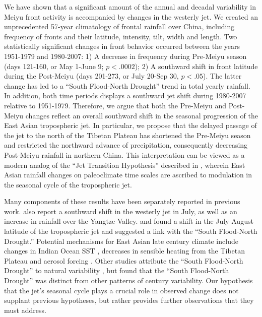 \documentclass[draft,grl]{AGUTeX}
\begin{document}
\begin{article}
	{\color{blue} We have shown that a significant amount of the annual and decadal variability in Meiyu front activity is accompanied by changes in the westerly jet. } We  created an unprecedented 57-year climatology of frontal rainfall over China, including frequency of fronts and their latitude, intensity, tilt, width and length. Two statistically significant changes in front behavior occurred between the years 1951-1979 and 1980-2007: 1) A decrease in frequency during Pre-Meiyu season (days 121-160, or May 1-June 9; $p < .0002$); 2) A southward shift in front latitude during the Post-Meiyu (days 201-273, or July 20-Sep 30, $p<.05$). The latter change has led to a ``South Flood-North Drought'' trend in total yearly rainfall. In addition, both time periods displays a southward jet shift during 1980-2007 relative to 1951-1979. Therefore, we argue that both the Pre-Meiyu and Post-Meiyu changes reflect an overall southward shift in the seasonal progression of the East Asian tropospheric jet.
{\color{blue}  In particular, we propose that the delayed passage of the jet to the north of the Tibetan Plateau has shortened the Pre-Meiyu season  and restricted the northward advance of precipitation, consequently decreasing Post-Meiyu rainfall in northern China. } 
This interpretation can be viewed as a modern analog of the ``Jet Transition Hypothesis'' described in \citet{Chiang2015}, wherein East Asian rainfall changes on paleoclimate time scales are ascribed to modulation in the seasonal cycle of the tropospheric jet. 	

 
	Many components of these results have been separately reported in previous work. \citet{Xuan2011} also report a southward shift in the westerly jet in July, as well as an increase in rainfall over the Yangtze Valley. \citet{Yu2004} and \citet{Yu2007} found a shift in the July-August latitude of the tropospheric jet and suggested a link with the ``South Flood-North Drought.'' Potential mechanisms for East Asian late  century climate include changes in Indian Ocean SST \citep{Qu2012}, decreases in sensible heating from the Tibetan Plateau \citep{Liu2012a,Hu2015} and aerosol forcing \citep{Song2014}. Other studies attribute the ``South Flood-North Drought'' to natural variability \citep{Zhang1999,Xin2006,Lei2014}, but \citet{Zhou2009} found that the ``South Flood-North Drought'' was distinct from other patterns of  century variability. Our hypothesis that the jet's seasonal cycle plays a crucial role in observed change does not supplant previous hypotheses, but rather provides further observations that they must address.
	

\end{article}
\end{document}
